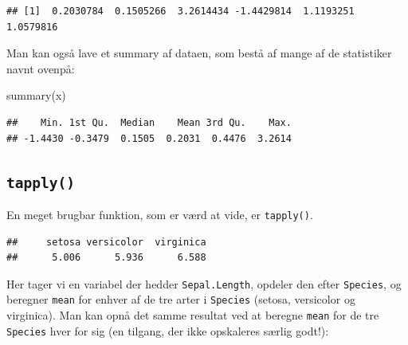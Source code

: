 \documentclass[
]{book}
\newenvironment{Shaded}{\begin{snugshade}}{\end{snugshade}}
\newcommand{\CommentTok}[1]{\textcolor[rgb]{0.56,0.35,0.01}{\textit{#1}}}
\newcommand{\FunctionTok}[1]{\textcolor[rgb]{0.00,0.00,0.00}{#1}}
\newcommand{\NormalTok}[1]{#1}
\newcommand{\SpecialCharTok}[1]{\textcolor[rgb]{0.00,0.00,0.00}{#1}}
\begin{document}
\begin{verbatim}
## [1]  0.2030784  0.1505266  3.2614434 -1.4429814  1.1193251  1.0579816
\end{verbatim}

Man kan også lave et summary af dataen, som bestå af mange af de statistiker navnt ovenpå:

\begin{Shaded}
\begin{Highlighting}[]
\FunctionTok{summary}\NormalTok{(x)}
\end{Highlighting}
\end{Shaded}

\begin{verbatim}
##    Min. 1st Qu.  Median    Mean 3rd Qu.    Max. 
## -1.4430 -0.3479  0.1505  0.2031  0.4476  3.2614
\end{verbatim}

\hypertarget{tapply}{%
\subsection{\texorpdfstring{\texttt{tapply()}}{tapply()}}\label{tapply}}

En meget brugbar funktion, som er værd at vide, er \texttt{tapply()}.

\begin{Shaded}
\end{Shaded}

\begin{verbatim}
##     setosa versicolor  virginica 
##      5.006      5.936      6.588
\end{verbatim}

Her tager vi en variabel der hedder \texttt{Sepal.Length}, opdeler den efter \texttt{Species}, og beregner \texttt{mean} for enhver af de tre arter i \texttt{Species} (setosa, versicolor og virginica). Man kan opnå det samme resultat ved at beregne \texttt{mean} for de tre \texttt{Species} hver for sig (en tilgang, der ikke opskaleres særlig godt!):
\end{document}
